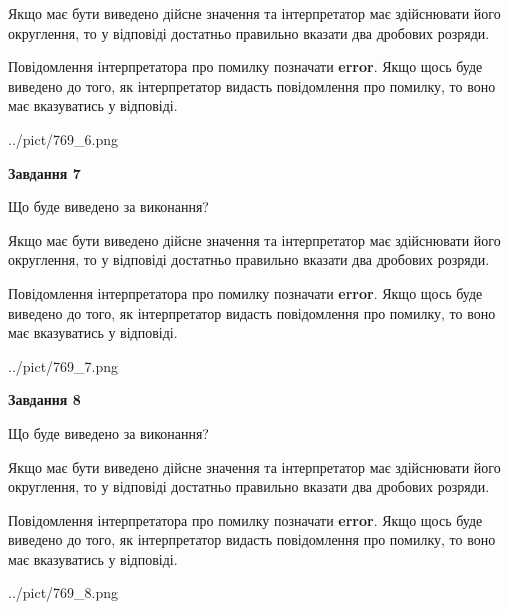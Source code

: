 \documentclass[12pt, ukrainian]{article}
\begin{document}
{\begin {Large}
Якщо має бути виведено дійсне значення та інтерпретатор має здійснювати його округлення, 
то у відповіді достатньо правильно вказати два дробових розряди.

Повідомлення інтерпретатора про помилку позначати \textbf{error}.
Якщо щось буде виведено до того, як інтерпретатор видасть повідомлення про помилку, 
то воно має вказуватись у відповіді. \par

\begin{center}
	{../pict/769_6.png}
\end{center}
\newpage

{\begin {center}\textbf{Завдання 7}\end {center}}\par
Що буде виведено за виконання? \par

Якщо має бути виведено дійсне значення та інтерпретатор має здійснювати його округлення, 
то у відповіді достатньо правильно вказати два дробових розряди.

Повідомлення інтерпретатора про помилку позначати \textbf{error}.
Якщо щось буде виведено до того, як інтерпретатор видасть повідомлення про помилку, 
то воно має вказуватись у відповіді. \par

\begin{center}
	{../pict/769_7.png}
\end{center}
\newpage

{\begin {center}\textbf{Завдання 8}\end {center}}\par
Що буде виведено за виконання? \par

Якщо має бути виведено дійсне значення та інтерпретатор має здійснювати його округлення, 
то у відповіді достатньо правильно вказати два дробових розряди.

Повідомлення інтерпретатора про помилку позначати \textbf{error}.
Якщо щось буде виведено до того, як інтерпретатор видасть повідомлення про помилку, 
то воно має вказуватись у відповіді. \par

\begin{center}
	{../pict/769_8.png}
\end{center}
\newpage


\end{Large}}
\end{document}
